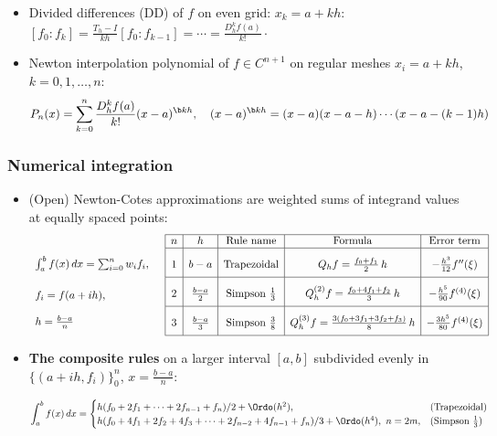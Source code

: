 \documentclass[a4paper]{article}
\begin{document}
\begin{itemize}
  \item Divided differences (DD)
    of $f$ on even grid: $x_k=a+kh$:
    $
    [f_0\!:\!f_k]
    =
     \frac{T_h-I}{kh}[f_0\!:\!f_{k-1}]
     = \cdots
     =\frac{D_h^kf(a)}{k!}
     \cdot
    $

  \item Newton interpolation polynomial
    of $f\in C^{n+1}$ on regular meshes $x_i=a+kh$,
    $k=0,1,\ldots,n$:
    \[
      P_n(x)
      = \sum_{k=0}^n
         \frac{D_h^kf(a)}{k!}
        (x-a)^{\scriptsize\b kh},
        \quad
        (x-a)^{\scriptsize\b kh}
         = (x-a)(x-a-h)\cdots(x-a-(k-1)h)
    \]

\end{itemize}%

\subsubsection*{Numerical integration}%

\begin{itemize}
  \item (Open) Newton-Cotes approximations are
  weighted sums of integrand values at equally spaced points:
  \[
\lower3em
\hbox{\begin{array}[t]{l}
    \int_a^bf(x)\,dx
      = \sum_{i=0}^{n} w_if_i,
      \\[17pt]
      f_i =f(a+ih),
      \\[12pt]
      h = \frac{b-a}{n}
    \end{array}}
  \quad
    \begin{array}[t]{*{12}{|c}|}
      \hline n & h & \text{Rule name}& \text{Formula} & \text{Error term} \\ \hline
      \rule[0pt]{0pt}{18pt} 1 & b-a &  \text{Trapezoidal}
      & Q_hf = \frac{f_0+f_1}{2}\,h & -\frac{h^3}{12}f''(\xi)
      \\[5pt] \hline
      \rule[0pt]{0pt}{18pt} 2 & \frac{b-a}{2} &  \text{Simpson $\frac13$}
      & Q^{(2)}_{h}f=\frac{f_0+4f_1+f_2}{3}\,h & -\frac{h^5}{90}f^{(4)}(\xi)
      \\[5pt] \hline
      \rule[0pt]{0pt}{18pt} 3 & \frac{b-a}{3} &  \text{Simpson $\frac38$}
      & Q^{(3)}_{h}f=\frac{3(f_0+3f_1+3f_2+f_3)}{8}\,h & -\frac{3h^5}{80}f^{(4)}(\xi)
      \\[5pt] \hline
    \end{array}
  \]

  \item
  \textbf{The composite rules} on a larger interval $[a,b]$ subdivided evenly in
    $\{(a+ih,f_i)\}_0^n$, $x=\frac{b-a}{n}$:

    \[
      \int_a^bf(x)\,dx
      =
      \begin{cases}
        h(f_0+2f_1+\cdots+2f_{n-1}+f_n)/2 + \Ordo(h^2),
        & \text{(Trapezoidal)}
        \\
        h(f_0+4f_1+2f_2+4f_3+\cdots+2f_{n-2}+4f_{n-1}+f_n)/3 + \Ordo(h^4),
        ~n=2m,
        & \text{(Simpson $\frac13$)}
      \end{cases}
    \]

\end{itemize}%
\end{document}

